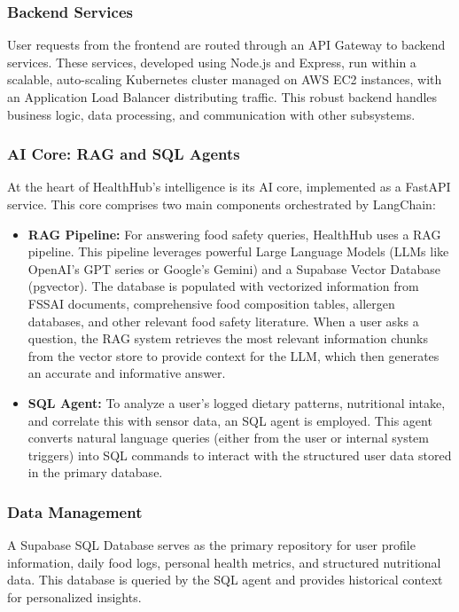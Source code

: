 \subsubsection{Backend Services}
User requests from the frontend are routed through an API Gateway to backend services. These services, developed using Node.js and Express, run within a scalable, auto-scaling Kubernetes cluster managed on AWS EC2 instances, with an Application Load Balancer distributing traffic. This robust backend handles business logic, data processing, and communication with other subsystems.

\subsubsection{AI Core: RAG and SQL Agents}
At the heart of HealthHub's intelligence is its AI core, implemented as a FastAPI service. This core comprises two main components orchestrated by LangChain:
\begin{itemize}
    \item \textbf{RAG Pipeline:} For answering food safety queries, HealthHub uses a RAG pipeline. This pipeline leverages powerful Large Language Models (LLMs like OpenAI's GPT series or Google's Gemini) and a Supabase Vector Database (pgvector). The database is populated with vectorized information from FSSAI documents, comprehensive food composition tables, allergen databases, and other relevant food safety literature. When a user asks a question, the RAG system retrieves the most relevant information chunks from the vector store to provide context for the LLM, which then generates an accurate and informative answer.
    \item \textbf{SQL Agent:} To analyze a user's logged dietary patterns, nutritional intake, and correlate this with sensor data, an SQL agent is employed. This agent converts natural language queries (either from the user or internal system triggers) into SQL commands to interact with the structured user data stored in the primary database.
\end{itemize}

\subsubsection{Data Management}
A Supabase SQL Database serves as the primary repository for user profile information, daily food logs, personal health metrics, and structured nutritional data. This database is queried by the SQL agent and provides historical context for personalized insights.

